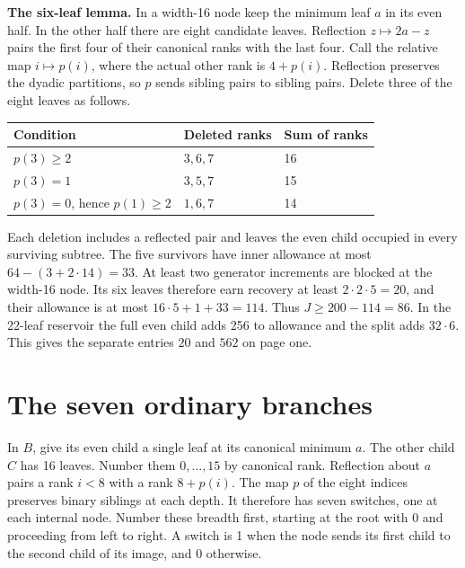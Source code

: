 \documentclass[12pt,letterpaper]{article}
\newcommand{\para}[1]{\par\medskip\noindent\textbf{#1}\quad}
\newcommand{\pagepart}[1]{\clearpage\section{#1}}
\begin{document}
\para{The six-leaf lemma.} In a width-16 node keep the minimum leaf \(a\) in its even half. In the other half there are eight candidate leaves. Reflection \(z\mapsto2a-z\) pairs the first four of their canonical ranks with the last four. Call the relative map \(i\mapsto p(i)\), where the actual other rank is \(4+p(i)\). Reflection preserves the dyadic partitions, so \(p\) sends sibling pairs to sibling pairs. Delete three of the eight leaves as follows.
\begin{center}\begin{tabular}{@{}lll@{}}\toprule
Condition & Deleted ranks & Sum of ranks\\\midrule
\(p(3)\ge2\) & \(3,6,7\) & 16\\
\(p(3)=1\) & \(3,5,7\) & 15\\
\(p(3)=0\), hence \(p(1)\ge2\) & \(1,6,7\) & 14\\\bottomrule
\end{tabular}\end{center}
Each deletion includes a reflected pair and leaves the even child occupied in every surviving subtree. The five survivors have inner allowance at most \(64-(3+2\cdot14)=33\). At least two generator increments are blocked at the width-16 node. Its six leaves therefore earn recovery at least \(2\cdot2\cdot5=20\), and their allowance is at most \(16\cdot5+1+33=114\). Thus \(J\ge200-114=86\). In the 22-leaf reservoir the full even child adds 256 to allowance and the split adds \(32\cdot6\). This gives the separate entries \(20\) and \(562\) on page one.

\pagepart{The seven ordinary branches}
In \(B\), give its even child a single leaf at its canonical minimum \(a\). The other child \(C\) has 16 leaves. Number them \(0,\ldots,15\) by canonical rank. Reflection about \(a\) pairs a rank \(i<8\) with a rank \(8+p(i)\). The map \(p\) of the eight indices preserves binary siblings at each depth. It therefore has seven switches, one at each internal node. Number these breadth first, starting at the root with 0 and proceeding from left to right. A switch is 1 when the node sends its first child to the second child of its image, and 0 otherwise.
\end{document}
